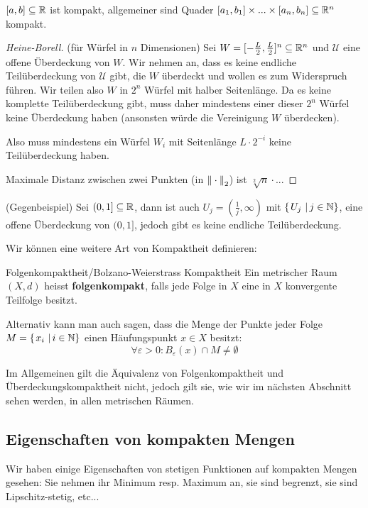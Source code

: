 \begin{example}
$[a,b] \subseteq \mathbb{R}$ ist kompakt, allgemeiner sind Quader $[a_1, b_1] \times ... \times [a_n, b_n] \subseteq \mathbb{R}^n$ kompakt.
\begin{proof}[Heine-Borell]
(für Würfel in $n$ Dimensionen) Sei $W = [-\frac{L}{2}, \frac{L}{2}]^n \subseteq \mathbb{R}^n$ und $\mathcal{U}$ eine offene Überdeckung von $W$. Wir nehmen an, dass es keine endliche Teilüberdeckung von $\mathcal{U}$ gibt, die $W$ überdeckt und wollen es zum Widerspruch führen. Wir teilen also $W$ in $2^n$ Würfel mit halber Seitenlänge. Da es keine komplette Teilüberdeckung gibt, muss daher mindestens einer dieser $2^n$ Würfel keine Überdeckung haben (ansonsten würde die Vereinigung $W$ überdecken). 

Also muss mindestens ein Würfel $W_i$ mit Seitenlänge $L\cdot 2^{-i}$ keine Teilüberdeckung haben.

Maximale Distanz zwischen zwei Punkten (in $\left\|\:\cdot\:\right\|_2$) ist $\sqrt[2]{n} \cdot ...$
\end{proof}

(Gegenbeispiel) Sei $(0 ,1] \subseteq \mathbb{R}$, dann ist auch $U_j = (\frac{1}{j}, \infty)$ mit $\left\{\left.U_j \ \right| j\in \mathbb{N} \right\}$, eine offene Überdeckung von $(0,1]$, jedoch gibt es keine endliche Teilüberdeckung.
\end{example}

Wir können eine weitere Art von Kompaktheit definieren:
\begin{definition}{Folgenkompaktheit/Bolzano-Weierstrass Kompaktheit}{}
Ein metrischer Raum $(X, d)$ heisst \textbf{folgenkompakt}, falls jede Folge in $X$ eine in $X$ konvergente Teilfolge besitzt.
\end{definition}
Alternativ kann man auch sagen, dass die Menge der Punkte jeder Folge $M = \left\{\left.x_i \ \right| i \in \mathbb{N} \right\}$ einen Häufungspunkt $x \in X$ besitzt:
$$\forall \varepsilon > 0: B_\varepsilon(x) \cap M \neq \emptyset$$

Im Allgemeinen gilt die Äquivalenz von Folgenkompaktheit und Überdeckungskompaktheit nicht, jedoch gilt sie, wie wir im nächsten Abschnitt sehen werden, in allen metrischen Räumen.

\subsection{Eigenschaften von kompakten Mengen}

Wir haben einige Eigenschaften von stetigen Funktionen auf kompakten Mengen gesehen: Sie nehmen ihr Minimum resp. Maximum an, sie sind begrenzt, sie sind Lipschitz-stetig, etc...

